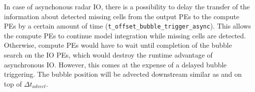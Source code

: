 \documentclass[10pt,a4paper,twoside,headinclude,footinclude,parskip=half]{scrartcl}
\newcommand{\paramform}[1]{\mbox{\texttt{#1}}\xspace}%
\newlength{\lenspeins}%
\newlength{\lenspzwei}%
\newlength{\lenspdrei}%
\newlength{\lenspvier}%
\begin{document}
In case of asynchonous radar IO, there is a possibility to delay the transfer of the information about detected
missing cells from the output PEs to the compute PEs by a certain amount of time (\paramform{t_offset_bubble_trigger_async}). This allows the compute PEs to
continue model integration while missing cells are detected. Otherwise, compute PEs would have to wait until completion of
the bubble search on the IO PEs, which would destroy the runtime advantage of asynchronous IO. However, this comes at the expense of
a delayed bubble triggering. The bubble position will be advected downstream similar as and on top of $\Delta t_{advect}$.

\setlength{\extrarowheight}{0.25\baselineskip}
\end{document}
